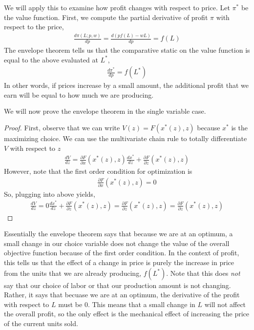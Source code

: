 We will apply this to examine how profit changes with respect to price. Let $\pi^*$ be the value function. First, we compute the partial derivative of profit $\pi$ with respect to the price,
\begin{align*}
    \frac{d\pi(L; p, w)}{dp} = \frac{d(p f(L) - w L)}{dp} = f(L)
\end{align*}
The envelope theorem tells us that the comparative static on the value function is equal to the above evaluated at $L^*$, 
\begin{align*}
    \frac{d \pi^*}{dp} = f(L^*)
\end{align*}
In other words, if prices increase by a small amount, the additional profit that we earn will be equal to how much we are producing. 

We will now prove the envelope theorem in the single variable case.

\begin{proof}
    First, observe that we can write $V(z) = F(x^*(z), z)$ because $x^*$ is the maximizing choice. We can use the multivariate chain rule to totally differentiate $V$ with respect to $z$
    \begin{align*}
        \frac{dV}{dz} = \frac{\partial F}{\partial x}(x^*(z), z) \frac{d x^*}{dz} + \frac{\partial F}{\partial z}(x^*(z), z)
    \end{align*}
    However, note that the first order condition for optimization is
    \begin{align*}
        \frac{\partial F}{\partial x}(x^*(z), z) = 0
    \end{align*}
    So, plugging into above yields,
    \begin{align*}
        \frac{dV}{dz} = 0 \frac{d x^*}{dz} + \frac{\partial F}{\partial z}(x^*(z), z) = \frac{\partial F}{\partial z}(x^*(z), z) = \frac{\partial F}{\partial z}(x^*(z), z)
    \end{align*}
\end{proof}

Essentially the envelope theorem says that because we are at an optimum, a small change in our choice variable does not change the value of the overall objective function because of the first order condition. In the context of profit, this tells us that the effect of a change in price is purely the increase in price from the units that we are already producing, $f(L^*)$. Note that this does \emph{not} say that our choice of labor or that our production amount is not changing. Rather, it says that becuase we are at an optimum, the derivative of the profit with respect to $L$ must be 0. This means that a small change in $L$ will not affect the overall profit, so the only effect is the mechanical effect of increasing the price of the current units sold.

